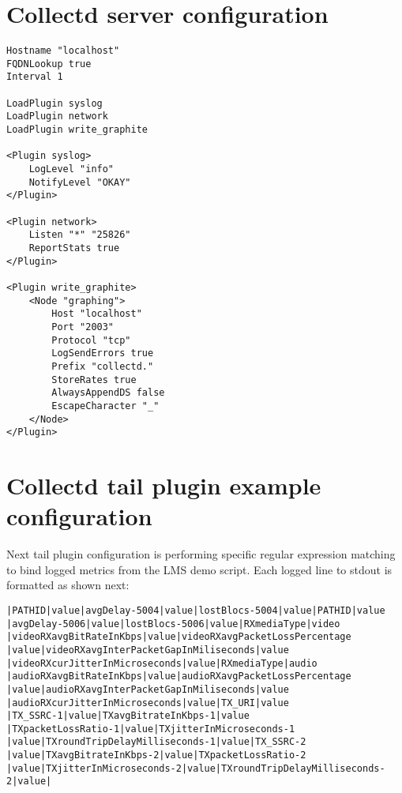 \section{Collectd server configuration}\label{ANX:collectdFiles2}

\begin{verbatim}
Hostname "localhost"
FQDNLookup true
Interval 1

LoadPlugin syslog
LoadPlugin network
LoadPlugin write_graphite

<Plugin syslog>
	LogLevel "info"
	NotifyLevel "OKAY"
</Plugin>

<Plugin network>
	Listen "*" "25826"
	ReportStats true
</Plugin>

<Plugin write_graphite>
	<Node "graphing">
		Host "localhost"
		Port "2003"
		Protocol "tcp"
		LogSendErrors true
		Prefix "collectd."
		StoreRates true
		AlwaysAppendDS false
		EscapeCharacter "_"
	</Node>
</Plugin>
\end{verbatim}

\section{Collectd tail plugin example configuration}\label{ANX:collectdTailFiles2}

Next tail plugin configuration is performing specific regular expression matching to bind logged metrics from the LMS demo script. Each logged line to stdout is formatted as shown next:

\begin{verbatim}
|PATHID|value|avgDelay-5004|value|lostBlocs-5004|value|PATHID|value
|avgDelay-5006|value|lostBlocs-5006|value|RXmediaType|video
|videoRXavgBitRateInKbps|value|videoRXavgPacketLossPercentage
|value|videoRXavgInterPacketGapInMiliseconds|value
|videoRXcurJitterInMicroseconds|value|RXmediaType|audio
|audioRXavgBitRateInKbps|value|audioRXavgPacketLossPercentage
|value|audioRXavgInterPacketGapInMiliseconds|value
|audioRXcurJitterInMicroseconds|value|TX_URI|value
|TX_SSRC-1|value|TXavgBitrateInKbps-1|value
|TXpacketLossRatio-1|value|TXjitterInMicroseconds-1
|value|TXroundTripDelayMilliseconds-1|value|TX_SSRC-2
|value|TXavgBitrateInKbps-2|value|TXpacketLossRatio-2
|value|TXjitterInMicroseconds-2|value|TXroundTripDelayMilliseconds-2|value|
\end{verbatim}

